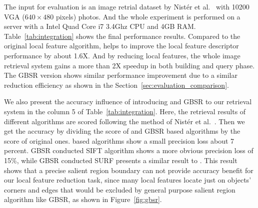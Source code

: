 The input for evaluation is an image retrial dataset by Nist\'er et al.~\cite{nister-stewenius-cvpr-2006} with 10200 VGA ($640\times480$ pixels) photos. And the whole experiment is performed on a server with a Intel Quad Core i7 3.4Ghz CPU and 4GB RAM. Table~\ref{tab:integration} shows the final performance results. Compared to the original local feature algorithm, {\sys} helps to improve the local feature descriptor performance by about 1.6X. And by reducing local features, the whole image retrieval system gains a more than 2X speedup in both building and query phase. The GBSR version shows similar performance improvement due to a similar reduction efficiency as shown in the Section~\ref{sec:evaluation_comparison}.

We also present the accuracy influence of introducing {\sys} and GBSR to our retrieval system in the column 5 of Table~\ref{tab:integration}. Here, the retrieval results of different algorithms are scored following the method of Nist\'er et al.~\cite{nister-stewenius-cvpr-2006}. Then we get the accuracy by dividing the score of {\sys} and GBSR based algorithms by the score of original ones. {\sys} based algorithms show a small precision loss about 7 percent. GBSR conducted SIFT algorithm shows a more obvious precision loss of 15\%, while GBSR conducted SURF presents a similar result to {\sys}. This result shows that a precise salient region boundary can not provide accuracy benefit for our local feature reduction task, since many local features locate just on objects' corners and edges that would be excluded by general purpose salient region algorithm like GBSR, as shown in Figure~\ref{fig:gbsr}.

